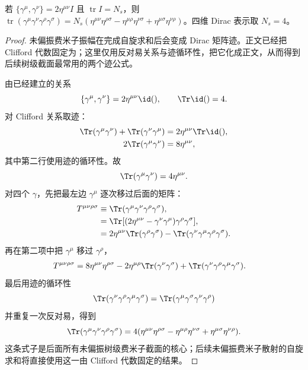 \begin{lemma}
若 $\{\gamma^\mu,\gamma^\nu\}=2\eta^{\mu\nu}I$ 且 $\operatorname{tr}I=N_s$，则 $\operatorname{tr}(\gamma^\mu\gamma^\nu\gamma^\rho\gamma^\sigma)=N_s(\eta^{\mu\nu}\eta^{\rho\sigma}-\eta^{\mu\rho}\eta^{\nu\sigma}+\eta^{\mu\sigma}\eta^{\nu\rho})$。四维 Dirac 表示取 $N_s=4$。
\end{lemma}

\begin{proof}
未偏振费米子振幅在完成自旋求和后会变成 Dirac 矩阵迹。正文已经把 Clifford 代数固定为；这里仅用反对易关系与迹循环性，把它化成正文，从而得到后续树级截面最常用的两个迹公式。



由已经建立的关系
\begin{equation*}
 \{\gamma^\mu,\gamma^\nu\}=2\eta^{\mu\nu}\id(),
 \qquad
 \Tr\id()=4.
\end{equation*}
对 Clifford 关系取迹：
\begin{align*}
 \Tr(\gamma^\mu\gamma^\nu)
 +\Tr(\gamma^\nu\gamma^\mu)
 &=2\eta^{\mu\nu}\Tr\id(),\\
 2\Tr(\gamma^\mu\gamma^\nu)
 &=8\eta^{\mu\nu},
\end{align*}
其中第二行使用迹的循环性。故
\begin{equation*}
 {\Tr(\gamma^\mu\gamma^\nu)=4\eta^{\mu\nu}.}
 \end{equation*}
对四个 $\gamma$，先把最左边 $\gamma^\mu$ 逐次移过后面的矩阵：
\begin{align*}
 T^{\mu\nu\rho\sigma}
 &\equiv\Tr(\gamma^\mu\gamma^\nu\gamma^\rho\gamma^\sigma),\\
 &=\Tr[(2\eta^{\mu\nu}-\gamma^\nu\gamma^\mu)
 \gamma^\rho\gamma^\sigma],\\
 &=2\eta^{\mu\nu}\Tr(\gamma^\rho\gamma^\sigma)
 -\Tr(\gamma^\nu\gamma^\mu\gamma^\rho\gamma^\sigma).
\end{align*}
再在第二项中把 $\gamma^\mu$ 移过 $\gamma^\rho$，
\begin{align*}
 T^{\mu\nu\rho\sigma}
 &=8\eta^{\mu\nu}\eta^{\rho\sigma}
 -2\eta^{\mu\rho}\Tr(\gamma^\nu\gamma^\sigma)
 +\Tr(\gamma^\nu\gamma^\rho\gamma^\mu\gamma^\sigma).
\end{align*}
最后用迹的循环性
\begin{equation*}
 \Tr(\gamma^\nu\gamma^\rho\gamma^\mu\gamma^\sigma)
 =\Tr(\gamma^\mu\gamma^\sigma\gamma^\nu\gamma^\rho)
\end{equation*}
并重复一次反对易，得到
\begin{equation*}
 {
 \Tr(\gamma^\mu\gamma^\nu\gamma^\rho\gamma^\sigma)
 =4(\eta^{\mu\nu}\eta^{\rho\sigma}
 -\eta^{\mu\rho}\eta^{\nu\sigma}
 +\eta^{\mu\sigma}\eta^{\nu\rho}).}
 \end{equation*}
这条式子是后面所有未偏振树级费米子截面的核心；后续未偏振费米子散射的自旋求和将直接使用这一由 Clifford 代数固定的结果。
\end{proof}

